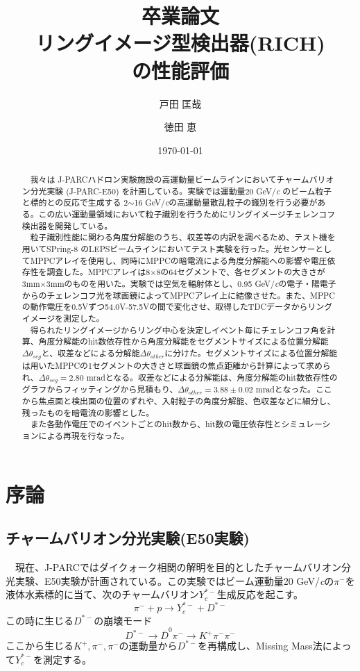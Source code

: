 \documentclass[uplatex, titlepage, dvipdfmx, 12pt, a4paper]{jsreport}
\title{ \huge 卒業論文\\ \Huge リングイメージ型検出器(RICH)\\の性能評価}
\author{ \LARGE 戸田 匡哉 \and \LARGE 徳田 恵}
\date{\Large \today}
\begin{document}
\maketitle
\begin{abstract}
　我々は J-PARCハドロン実験施設の高運動量ビームラインにおいてチャームバリオン分光実験 (J-PARC-E50) を計画している。実験では運動量20 GeV/{\sl c} のビーム粒子と標的との反応で生成する 2$\sim$16 GeV/{\sl c}の高運動量散乱粒子の識別を行う必要がある。この広い運動量領域において粒子識別を行うためにリングイメージチェレンコフ検出器を開発している。\\
　粒子識別性能に関わる角度分解能のうち、収差等の内訳を調べるため、テスト機を用いてSPring-8 のLEPSビームラインにおいてテスト実験を行った。光センサーとしてMPPCアレイを使用し、同時にMPPCの暗電流による角度分解能への影響や電圧依存性を調査した。MPPCアレイは8$\times$8の64セグメントで、各セグメントの大きさが3mm$\times$3mmのものを用いた。実験では空気を輻射体とし、0.95 GeV/{\sl c}の電子・陽電子からのチェレンコフ光を球面鏡によってMPPCアレイ上に結像させた。また、MPPCの動作電圧を0.5Vずつ54.0V-57.5Vの間で変化させ、取得したTDCデータからリングイメージを測定した。\\
　得られたリングイメージからリング中心を決定しイベント毎にチェレンコフ角を計算、角度分解能のhit数依存性から角度分解能をセグメントサイズによる位置分解能$\Delta\theta_{seg}$と、収差などによる分解能$\Delta\theta_{other}$に分けた。セグメントサイズによる位置分解能は用いたMPPCの1セグメントの大きさと球面鏡の焦点距離から計算によって求められ、$\Delta\theta_{seg}=2.80$ mradとなる。収差などによる分解能は、角度分解能のhit数依存性のグラフからフィッティングから見積もり、$\Delta\theta_{other}=3.88 \pm 0.02$ mradとなった。ここから焦点面と検出面の位置のずれや、入射粒子の角度分解能、色収差などに細分し、残ったものを暗電流の影響とした。\\
　また各動作電圧でのイベントごとのhit数から、hit数の電圧依存性とシミュレーションによる再現を行なった。


\end{abstract}
\tableofcontents
\chapter{序論}
\section{チャームバリオン分光実験(E50実験)}
　現在、J-PARCではダイクォーク相関の解明を目的としたチャームバリオン分光実験、E50実験が計画されている。この実験ではビーム運動量20 GeV/{\sl c}の$\pi^-$を液体水素標的に当て、次のチャームバリオン$Y^{*-}_c$生成反応を起こす。
\begin{equation}
\pi^- + p \to Y^{*-}_c + D^{*-}
\end{equation}
この時に生じる$D^{*-}$の崩壊モード
\begin{equation}
D^{*-} \to \overline{D}^0\pi^- \to K^+\pi^-\pi^-
\end{equation}
ここから生じる$K^+, \pi^-, \pi^-$の運動量から$D^{*-}$を再構成し、Missing Mass法によって$Y^{*-}_c$を測定する。
\end{document}
